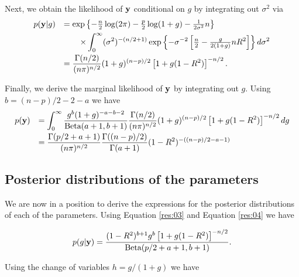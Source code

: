 \documentclass{amsart}[12pt]
\begin{document}
Next, we obtain the likelihood of ${\bf y}$ conditional on $g$ by integrating out $\sigma^2$ via
$$
\begin{array}{rl}
	\displaystyle p({\bf y}|g) 
	  & \displaystyle = \exp\left\{                                                                                 
	- \tfrac{n}{2}\log(2\pi) - \tfrac{p}{2}\log(1+g) 
	- \tfrac{1}{2\sigma^2}n
	\right\}
	\\ [1ex]
	  & \displaystyle \qquad \times                                                                                 
	\int_0^\infty (\sigma^2)^{-(n/2 + 1)}
	\exp\left\{
	- \sigma^{-2} \left[ \tfrac{n}{2} - \tfrac{g}{2(1+g)} nR^2 \right] 
	\right\} d\sigma^2
	\\ [2ex]
	  & \displaystyle = \frac{\Gamma(n/2)}{(n\pi)^{n/2}} (1 + g)^{(n-p)/2} \left[  1 + g(1 -  R^2) \right] ^{-n/2}. 
\end{array}
$$

\noindent Finally, we derive the marginal likelihood of ${\bf y}$ by integrating out $g$. Using $b= (n-p)/2 - 2 - a$ we have
$$
\begin{array}{rl}
	\displaystyle p({\bf y}) 
	  & \displaystyle = \int_0^\infty                                         
	\frac{g^{b}(1 + g)^{-a-b-2}}{\mbox{Beta}(a+1,b+1)}
	\frac{\Gamma(n/2)}{(n\pi)^{n/2}} (1 + g)^{(n-p)/2} \left[  1 + g(1 -  R^2) \right]^{-n/2}
	dg
	\\ [2ex]
	  & \displaystyle                                                         
	= \frac{\Gamma( p/2 + a + 1)}{(n\pi)^{n/2}} 
	\frac{\Gamma((n-p)/2)}{\Gamma(a+1)} (1 -  R^2)^{-((n-p)/2 - a - 1)} \\
\end{array}
$$

\subsection{Posterior distributions of the parameters}
We are now in a position to derive the expressions for the posterior distributions of each of the parameters.
Using Equation \ref{res:03} and Equation \ref{res:04} we have

\begin{equation}\label{res:06}
	p(g|{\bf y}) = \frac{(1 -  R^2)^{b+1} g^{b} \left[  1 + g(1 -  R^2) \right]^{-n/2}}{\mbox{Beta}(p/2 + a + 1,b+1)}.
\end{equation}

\noindent Using the change of variables $h=g/(1+g)$ we have
\end{document}
